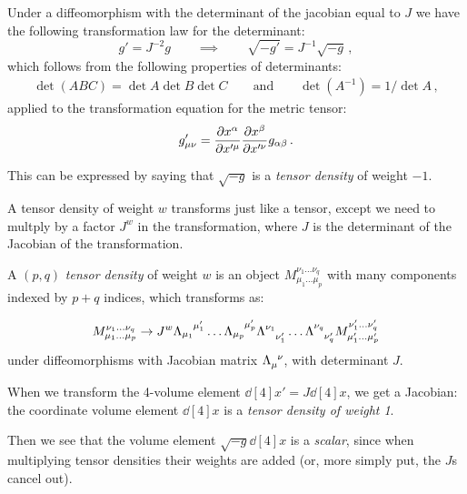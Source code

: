 \documentclass[main.tex]{subfiles}
\begin{document}
Under a diffeomorphism with the determinant of the jacobian equal to \(J\) we have the following transformation law for the determinant: 
%
\begin{equation}
  g' = J^{-2} g
  \qquad \implies \qquad
  \sqrt{-g'}  = J^{-1} \sqrt{-g} 
\,,
\end{equation}
%
which follows from the following properties of determinants: 
%
\begin{align}
  \det(ABC)= \det A \det B \det C 
  \qquad \text{and} \qquad 
  \det (A^{-1}) = 1 / \det A 
\,,
\end{align}
%
applied to the transformation equation for the metric tensor: 
%
\begin{align}
g_{\mu \nu }^{\prime } = \pdv{x^{\alpha }}{x^{\prime \mu }} \pdv{x^{\beta }}{x^{\prime \nu }} g_{\alpha \beta }
\,.
\end{align}
%

This can be expressed by saying that \(\sqrt{-g} \) is a \emph{tensor density} of weight \(-1\).

\begin{definition}
A tensor density of weight \(w\) transforms just like a tensor, except we need to multply by a factor \(J^{w}\) in the transformation, where \(J\) is the determinant of the Jacobian of the transformation.

A \((p, q)\) \emph{tensor density} of weight \(w\) is an object \(M_{\mu_1 \dots \mu_p}^{\nu_1 \dots \nu_q}\) with many components indexed by \(p+q\) indices, which transforms as:

\begin{equation}
    M_{\mu_1 \dots \mu_p}^{\nu_1 \dots \nu_q}
    \rightarrow
    J^{w}
    \tensor{\Lambda}{_{\mu_1}^{\mu'_1}}\dots
    \tensor{\Lambda}{_{\mu_p}^{\mu'_p}}
    \tensor{\Lambda}{^{\nu_1}_{\nu'_1}}\dots
    \tensor{\Lambda}{^{\nu_q}_{\nu'_q}}
    M_{\mu_1' \dots \mu_p'}^{\nu_1' \dots \nu_q'}
\end{equation}
%
under diffeomorphisms with Jacobian matrix \(\tensor{\Lambda}{_\mu^\nu}\), with determinant \(J\).
\end{definition}

When we transform the 4-volume element \(\dd[4]{x'} = J \dd[4]{x} \), we get a Jacobian: the coordinate volume element \(\dd[4]{x} \) is a \emph{tensor density of weight 1}.

Then we see that the volume element \(\sqrt{-g} \dd[4]{x} \) is a \emph{scalar}, since when multiplying tensor densities their weights are added (or, more simply put, the \(J\)s cancel out).
\end{document}
